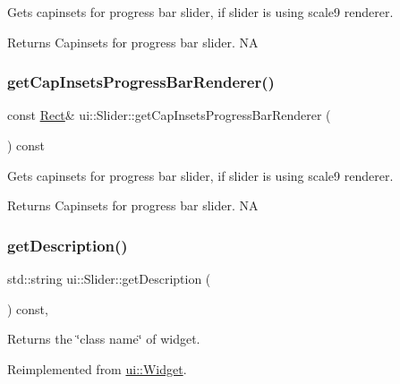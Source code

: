 Gets capinsets for progress bar slider, if slider is using scale9 renderer. \begin{DoxyReturn}{Returns}
Capinsets for progress bar slider.  NA 
\end{DoxyReturn}
\mbox{\label{classui_1_1Slider_a77f08827e7585200f40eb34bbc9fedd9}} 
\subsubsection{\texorpdfstring{get\+Cap\+Insets\+Progress\+Bar\+Renderer()}{getCapInsetsProgressBarRenderer()}\hspace{0.1cm}{\footnotesize\ttfamily [2/2]}}
{\footnotesize\ttfamily const \hyperlink{classRect}{Rect}\& ui\+::\+Slider\+::get\+Cap\+Insets\+Progress\+Bar\+Renderer (\begin{DoxyParamCaption}{ }\end{DoxyParamCaption}) const}

Gets capinsets for progress bar slider, if slider is using scale9 renderer. \begin{DoxyReturn}{Returns}
Capinsets for progress bar slider.  NA 
\end{DoxyReturn}
\mbox{\label{classui_1_1Slider_a8267160a9d513ad4761eb916a76223ec}} 
\subsubsection{\texorpdfstring{get\+Description()}{getDescription()}\hspace{0.1cm}{\footnotesize\ttfamily [1/2]}}
{\footnotesize\ttfamily std\+::string ui\+::\+Slider\+::get\+Description (\begin{DoxyParamCaption}{ }\end{DoxyParamCaption}) const\hspace{0.3cm}{\ttfamily [override]}, {\ttfamily [virtual]}}

Returns the \char`\"{}class name\char`\"{} of widget. 

Reimplemented from \hyperlink{classui_1_1Widget_ad85abdaa9133dc6b8efc32670ae9b93f}{ui\+::\+Widget}.

